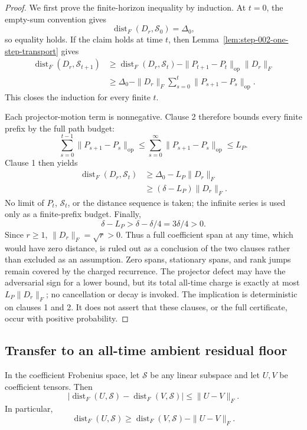 \begin{proof}
We first prove the finite-horizon inequality by induction.  At $t=0$, the
empty-sum convention gives
\[
\operatorname{dist}_F(D_r,\mathcal S_0)=\Delta_0,
\]
so equality holds.  If the claim holds at time $t$, then
Lemma~\ref{lem:step-002-one-step-transport} gives
\[
\begin{aligned}
\operatorname{dist}_F(D_r,\mathcal S_{t+1})
&\geq\operatorname{dist}_F(D_r,\mathcal S_t)
 -\|P_{t+1}-P_t\|_{\mathrm{op}}\|D_r\|_F\\
&\geq\Delta_0-\|D_r\|_F
 \sum_{s=0}^{t}\|P_{s+1}-P_s\|_{\mathrm{op}}.
\end{aligned}
\]
This closes the induction for every finite $t$.

Each projector-motion term is nonnegative.  Clause 2 therefore bounds every
finite prefix by the full path budget:
\[
\sum_{s=0}^{t-1}\|P_{s+1}-P_s\|_{\mathrm{op}}
\leq
\sum_{s=0}^{\infty}\|P_{s+1}-P_s\|_{\mathrm{op}}
\leq L_P.
\]
Clause 1 then yields
\[
\begin{aligned}
\operatorname{dist}_F(D_r,\mathcal S_t)
&\geq\Delta_0-L_P\|D_r\|_F\\
&\geq(\delta-L_P)\|D_r\|_F.
\end{aligned}
\]
No limit of $P_t$, $\mathcal S_t$, or the distance sequence is taken; the
infinite series is used only as a finite-prefix budget.  Finally,
\[
\delta-L_P>\delta-\delta/4=3\delta/4>0.
\]
Since $r\geq1$, $\|D_r\|_F=\sqrt r>0$.  Thus a full coefficient span at
any time, which would have zero distance, is ruled out as a conclusion of the
two clauses rather than excluded as an assumption.  Zero spans, stationary
spans, and rank jumps remain covered by the charged recurrence.  The
projector defect may have the adversarial sign for a lower bound, but its
total all-time charge is exactly at most $L_P\|D_r\|_F$; no cancellation or
decay is invoked.
The implication is deterministic on clauses 1 and 2.  It does not assert
that these clauses, or the full certificate, occur with positive probability.
\end{proof}

\subsection{Transfer to an all-time ambient residual floor}
\label{app:step-003}

\begin{lemma}
\label{lem:step-003-distance-lipschitz}
In the coefficient Frobenius space, let $\mathcal S$ be any linear subspace
and let $U,V$ be coefficient tensors.  Then
\[
\left|
\operatorname{dist}_F(U,\mathcal S)
-\operatorname{dist}_F(V,\mathcal S)
\right|
\leq\|U-V\|_F.
\]
In particular,
\[
\operatorname{dist}_F(U,\mathcal S)
\geq\operatorname{dist}_F(V,\mathcal S)-\|U-V\|_F.
\]
\end{lemma}


